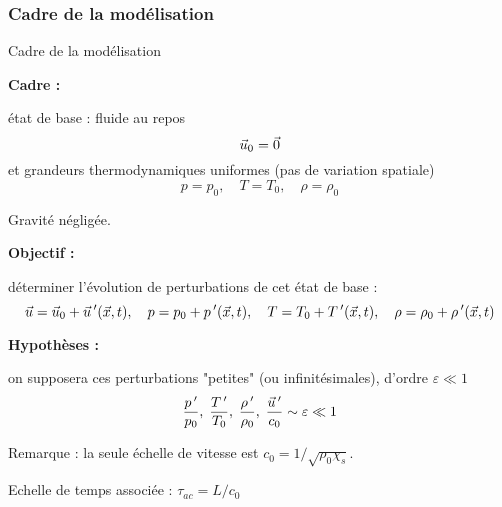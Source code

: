 \subsubsection{Cadre de la modélisation}
\begin{frame}{Cadre de la modélisation}

\small

\pause

\textbf{Cadre :} \medskip

état de base : fluide au repos
\[
	\vec{u}_0 = \vec{0}
\]
et grandeurs thermodynamiques uniformes (pas de variation spatiale) 
\[
	p=p_0, \quad T=T_0, \quad \rho = \rho_0
\]

Gravité négligée.

\bigskip \pause

\textbf{Objectif :} \medskip

déterminer l'évolution de perturbations de cet état de base :
\[
	\vec{u} = \vec{u}_0 + \vec{u}\ \!'(\vec{x}, t), \quad
  p = p_0 + p\ \!'(\vec{x}, t), \quad
  T = T_0 + T\ \!'(\vec{x}, t), \quad
  \rho = \rho_0 + \rho\ \!'(\vec{x}, t)
\]

\bigskip \pause

\textbf{Hypothèses :} \medskip

on supposera ces perturbations "petites" (ou infinitésimales), d'ordre $\varepsilon \ll 1$
\[
	\frac{p\ \!'}{p_0}, \; \frac{T\ \!'}{T_0}, \; \frac{\rho\ \!'}{\rho_0}, 
	\; 
	\frac{\vec{u}\ \!'}{c_0}
	\sim \varepsilon \ll 1	
\]

Remarque : la seule échelle de vitesse est $c_0 = 1/\sqrt{\rho_0 \chi_s}$.

\smallskip 
Echelle de temps associée : $\tau_{ac} =  L/c_0$ 


\vspace{10mm}

\end{frame}


